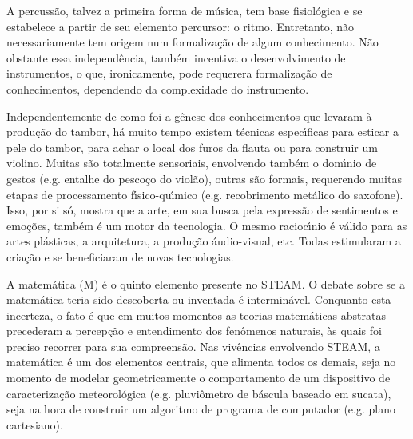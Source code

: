 \documentclass[
12pt,		%
openright,	%
twoside,  %
a4paper,			%
chapter=TITLE,		%
english,			%
french,				%
spanish,			%
brazil				%
]{USPSC-classe/USPSC}
\begin{document}
A percuss\~ao, talvez a primeira forma de m\'usica, tem base fisiol\'ogica e se estabelece a partir de seu elemento percursor: o ritmo. Entretanto, n\~ao necessariamente tem origem num formaliza\c{c}\~ao de algum conhecimento. N\~ao obstante essa independ\^encia, tamb\'em incentiva o desenvolvimento de instrumentos, o que, ironicamente, pode requerera formaliza\c{c}\~ao de conhecimentos, dependendo da complexidade do instrumento.









Independentemente de como foi a g\^enese dos conhecimentos que levaram \`a produ\c{c}\~ao do tambor, h\'a muito tempo existem t\'ecnicas espec\'{\i}ficas para esticar a pele do tambor, para achar o local dos furos da flauta ou para construir um violino. Muitas s\~ao totalmente sensoriais, envolvendo tamb\'em o dom\'{\i}nio de gestos (e.g. entalhe do pesco\c{c}o do viol\~ao), outras s\~ao formais, requerendo muitas etapas de processamento f\'{\i}sico-qu\'{\i}mico (e.g. recobrimento met\'alico do saxofone). Isso, por si s\'o, mostra que a arte, em sua busca pela express\~ao de sentimentos e emo\c{c}\~oes, tamb\'em \'e um motor da tecnologia. O mesmo racioc\'{\i}nio \'e v\'alido para as artes pl\'asticas, a arquitetura, a produ\c{c}\~ao \'audio-visual, etc. Todas estimularam a cria\c{c}\~ao e se beneficiaram de novas tecnologias.









A matem\'atica (M) \'e o quinto elemento presente no STEAM. O debate sobre se a matem\'atica teria sido descoberta ou inventada \'e intermin\'avel. Conquanto esta incerteza, o fato \'e que em muitos momentos as teorias matem\'aticas abstratas precederam a percep\c{c}\~ao e entendimento dos fen\^omenos naturais, \`as quais foi preciso recorrer para sua compreens\~ao. Nas viv\^encias envolvendo STEAM, a matem\'atica \'e um dos elementos centrais, que alimenta todos os demais, seja no momento de modelar geometricamente o comportamento de um dispositivo de caracteriza\c{c}\~ao meteorol\'ogica (e.g. pluvi\^ometro de b\'ascula baseado em sucata), seja na hora de construir um algoritmo de programa de computador (e.g. plano cartesiano).
\end{document}
